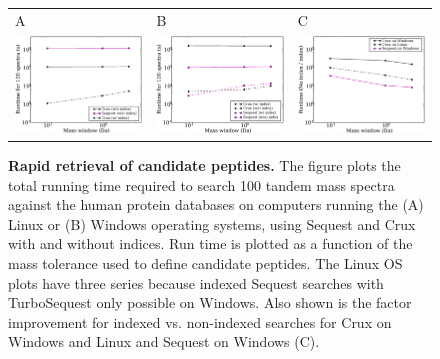 \documentclass[12pt]{article}
\begin{document}
\begin{figure}
  \centering
  \begin{tabular}{lll}
    {\sf A} & {\sf B} & {\sf C} \\
  \includegraphics[width=2.25in]{../../results/paper-figure/index/indexing-human.eps} &
  \includegraphics[width=2.25in]{../../results/paper-figure/turbo-no-missed-human/indexing-yeast-windows.eps} & 
  \includegraphics[width=2.25in]{../../results/paper-figure/comparison/ratio.eps} \\
\end{tabular}
  \caption{{\bf Rapid retrieval of candidate peptides.}  The figure
  plots the total running time required to search 100 tandem mass
  spectra against the human protein databases
  on computers running the ({\sf A}) Linux
  or ({\sf B}) Windows operating systems, using {\sc Sequest} and Crux with 
  and without indices.
  Run time is plotted 
  as a function of the mass tolerance used to define candidate
  peptides. The Linux OS plots have three series
  because indexed {\sc Sequest} searches with TurboSequest only possible on Windows.
  Also shown is the factor improvement for indexed vs. non-indexed searches
  for Crux on Windows and Linux and Sequest on Windows ({\sf C}).
  \label{figure:indexing}}
\end{figure}
\end{document}
